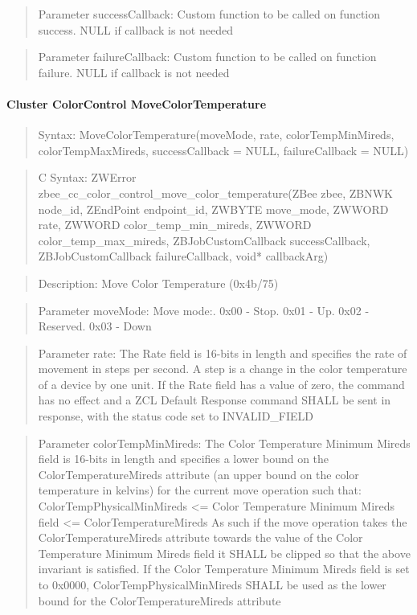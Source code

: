 \begin{quote}Parameter successCallback: Custom function to be called on function success. NULL if callback is not needed\end{quote}
\begin{quote}Parameter failureCallback: Custom function to be called on function failure. NULL if callback is not needed\end{quote}


\paragraph{Cluster ColorControl MoveColorTemperature}
\begin{quote}Syntax: MoveColorTemperature(moveMode, rate, colorTempMinMireds, colorTempMaxMireds, successCallback = NULL, failureCallback = NULL)\end{quote}
\begin{quote}C Syntax: ZWError zbee\_cc\_color\_control\_move\_color\_temperature(ZBee zbee, ZBNWK node\_id, ZEndPoint endpoint\_id, ZWBYTE move\_mode, ZWWORD rate, ZWWORD color\_temp\_min\_mireds, ZWWORD color\_temp\_max\_mireds, ZBJobCustomCallback successCallback, ZBJobCustomCallback failureCallback, void* callbackArg)\end{quote}
\begin{quote}Description: Move Color Temperature (0x4b/75)\end{quote}
\begin{quote}Parameter moveMode: Move mode:. 0x00 - Stop. 0x01 - Up. 0x02 - Reserved. 0x03 - Down\end{quote}
\begin{quote}Parameter rate: The Rate field is 16-bits in length and specifies the rate of movement in steps per second. A step is a change in the color temperature of a device by one unit. If the Rate field has a value of zero, the command has no effect and a ZCL Default Response command SHALL be sent in response, with the status code set to INVALID\_FIELD\end{quote}
\begin{quote}Parameter colorTempMinMireds: The Color Temperature Minimum Mireds field is 16-bits in length and specifies a lower bound on the ColorTemperatureMireds attribute (an upper bound on the color temperature in kelvins) for the current move operation such that: ColorTempPhysicalMinMireds <= Color Temperature Minimum Mireds field <= ColorTemperatureMireds As such if the move operation takes the ColorTemperatureMireds attribute towards the value of the Color Temperature Minimum Mireds field it SHALL be clipped so that the above invariant is satisfied. If the Color Temperature Minimum Mireds field is set to 0x0000, ColorTempPhysicalMinMireds SHALL be used as the lower bound for the ColorTemperatureMireds attribute\end{quote}
